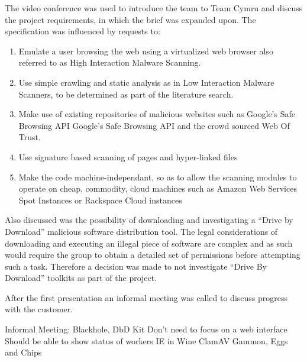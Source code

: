 The video conference was used to introduce the team to Team Cymru and discuss the project requirements, in which the brief was expanded upon. The specification was influenced by requests to:
\begin{enumerate}
    \item Emulate a user browsing the web using a virtualized web browser also referred to as High Interaction Malware Scanning.

    \item Use simple crawling and static analysis as in Low Interaction Malware Scanners, to be determined as part of the literature search.

    \item Make use of existing repositories of malicious websites such as Google's Safe Browsing API\cite{google-safe} Google's Safe Browsing API and the crowd sourced Web Of Trust.

    \item Use signature based scanning of pages and hyper-linked files

    \item Make the code machine-independant, so as to allow the scanning modules to operate on cheap, commodity, cloud machines such as Amazon Web Services Spot Instances\cite{aws-spot} or Rackspace Cloud instances\cite{rackspace}
\end{enumerate}

Also discussed was the possibility of downloading and investigating a ``Drive by Download'' malicious software distribution tool.  The legal considerations of downloading and executing an illegal piece of software are complex and as such would require the group to obtain a detailed set of permissions before attempting such a task. Therefore a decision was made to not investigate ``Drive By Download'' toolkits as part of the project.

After the first presentation an informal meeting was called to discuss progress with the customer.

Informal Meeting:
    Blackhole, DbD Kit
    Don't need to focus on a web interface
    Should be able to show status of workers
    IE in Wine
    ClamAV
    Gammon, Eggs and Chips



